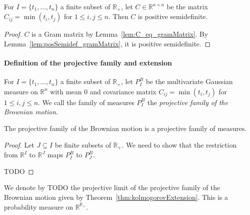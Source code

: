 \begin{lemma}\label{lem:posSemidef_brownianCov}
For $I = \{t_1, \ldots, t_n\}$ a finite subset of $\mathbb{R}_+$, let $C \in \mathbb{R}^{n \times n}$ be the matrix $C_{ij} = \min(t_i, t_j)$ for $1 \leq i,j \leq n$.
Then $C$ is positive semidefinite.
\end{lemma}

\begin{proof}
$C$ is a Gram matrix by Lemma~\ref{lem:C_eq_gramMatrix}.
By Lemma~\ref{lem:posSemidef_gramMatrix}, it is positive semidefinite.
\end{proof}


\paragraph{Definition of the projective family and extension}

\begin{definition}\label{def:gaussianProjectiveFamily}
For $I = \{t_1, \ldots, t_n\}$ a finite subset of $\mathbb{R}_+$, let $P^B_I$ be the multivariate Gaussian measure on $\mathbb{R}^n$ with mean $0$ and covariance matrix $C_{ij} = \min(t_i, t_j)$ for $1 \leq i,j \leq n$.
We call the family of measures $P^B_I$ the \emph{projective family of the Brownian motion}.
\end{definition}


\begin{lemma}\label{lem:isProjectiveMeasureFamily_gaussianProjectiveFamily}
The projective family of the Brownian motion is a projective family of measures.
\end{lemma}

\begin{proof}
Let $J \subseteq I$ be finite subsets of $\mathbb{R}_+$.
We need to show that the restriction from $\mathbb{R}^I$ to $\mathbb{R}^J$ maps $P^B_I$ to $P^B_J$.

TODO
\end{proof}


\begin{definition}\label{def:gaussianLimit}
We denote by TODO the projective limit of the projective family of the Brownian motion given by Theorem~\ref{thm:kolmogorovExtension}.
This is a probability measure on $\mathbb{R}^{\mathbb{R}_+}$.
\end{definition}


